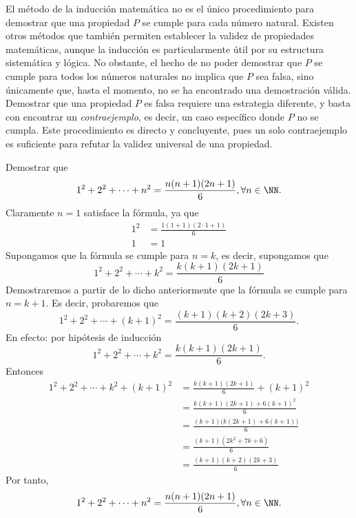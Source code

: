 El método de la inducción matemática no es el único procedimiento para demostrar que una propiedad $P$ se cumple para cada número natural. Existen otros métodos que también permiten establecer la validez de propiedades matemáticas, aunque la inducción es particularmente útil por su estructura sistemática y lógica. No obstante, el hecho de no poder demostrar que $P$ se cumple para todos los números naturales no implica que $P$ sea falsa, sino únicamente que, hasta el momento, no se ha encontrado una demostración válida. Demostrar que una propiedad $P$ es falsa requiere una estrategia diferente, y basta con encontrar un \emph{contraejemplo}, es decir, un caso específico donde $P$ no se cumpla. Este procedimiento es directo y concluyente, pues un solo contraejemplo es suficiente para refutar la validez universal de una propiedad. 

\newpage

\begin{examplebox}{}{}
    Demostrar que
    $$1^2+2^2+\cdots +n^2=\frac{n(n+1)(2n+1)}{6}, \forall n \in \NN.$$
    \demostracion Claramente $n=1$ satisface la fórmula, ya que
    \begin{align*}
        1^2 &=\frac{1(1+1)(2\cdot 1+1)}{6} \\
        1 &=1
    \end{align*}
    Supongamos que la fórmula se cumple para $n=k$, es decir, supongamos que
    $$1^2+2^2+\cdots +k^2=\frac{k(k+1)(2k+1)}{6}$$
    Demostraremos a partir de lo dicho anteriormente que la fórmula se cumple para $n=k+1$. Es decir, probaremos que
    $$1^2+2^2+\cdots +(k+1)^2=\frac{(k+1)(k+2)(2k+3)}{6}.$$
    En efecto: por hipótesis de inducción
    $$1^2+2^2+\cdots +k^2=\frac{k(k+1)(2k+1)}{6}.$$
    Entonces
    \begin{align*}
        1^2 +2^2+\cdots +k^2+(k+1)^2 &=\frac{k(k+1)(2k+1)}{6}+(k+1)^2 \\
        &=\frac{k(k+1)(2k+1)+6(k+1)^2}{6} \\
        &=\frac{(k+1)\big(k(2k+1)+6(k+1)\big)}{6} \\
        &=\frac{(k+1)(2k^2+7k+6)}{6} \\
        &=\frac{(k+1)(k+2)(2k+3)}{6}
    \end{align*}
    Por tanto,
    $$1^2+2^2+\cdots +n^2=\frac{n(n+1)(2n+1)}{6}, \forall n \in \NN.$$
\end{examplebox}

